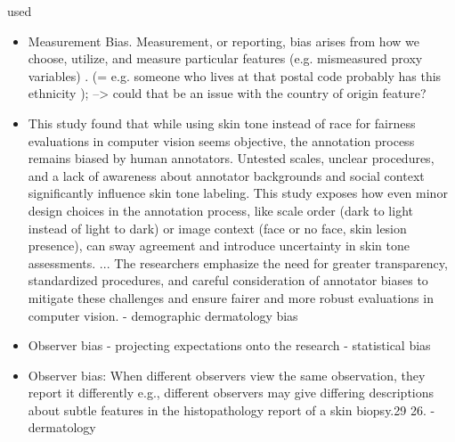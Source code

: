 \documentclass[12pt, a4paper, oneside]{book}   	%
\newif\ifrawcitationactive
\newcommand{\rawcitationstart}{
	\color{purple}\rawcitationactivetrue
}
\newcommand{\rawcitationusedstart}{\color{violet}}
\begin{document}
			
			\rawcitationstart
			used
			\begin{itemize}		
				\rawcitationusedstart
				\item Measurement Bias. Measurement, or reporting, bias arises from how we choose, utilize, and measure particular features \autocite{M144_Suresh_2021} (e.g. mismeasured proxy variables) \autocite{Mehrabi_2021}. (= e.g. someone who lives at that postal code probably has this ethnicity ); --> could that be an issue with the country of origin feature?
			
				\item This study found that while using skin tone instead of race for fairness evaluations in computer vision seems objective, the annotation process remains biased by human annotators. Untested scales, unclear procedures, and a lack of awareness about annotator backgrounds and social context significantly influence skin tone labeling. This study exposes how even minor design choices in the annotation process, like scale order (dark to light instead of light to dark) or image context (face or no face, skin lesion presence), can sway agreement and introduce uncertainty in skin tone assessments. ... The researchers emphasize the need for greater transparency, standardized procedures, and careful consideration of annotator biases to mitigate these challenges and ensure fairer and more robust evaluations in computer vision. \autocite{Montoya_2025} - demographic dermatology bias
			
				\item Observer bias - projecting expectations onto the research \autocites{Mester_2022}{Mester_2017} - statistical bias
				\item  Observer bias: When different observers view the same observation, they report it differently e.g., different observers may give differing descriptions about subtle features in the histopathology report of a skin biopsy.29 26. \autocite{Chakraborty_2024} - dermatology
					

\end{itemize}
\end{document}
